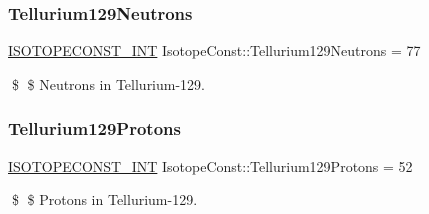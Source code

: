 \subsubsection{\texorpdfstring{Tellurium129\+Neutrons}{Tellurium129Neutrons}}
{\footnotesize\ttfamily \mbox{\hyperlink{group___isotope_const-_macros_ga5f18360b3e99483a35c32d789e62621c}{I\+S\+O\+T\+O\+P\+E\+C\+O\+N\+S\+T\+\_\+\+I\+NT}} Isotope\+Const\+::\+Tellurium129\+Neutrons = 77}

\$ \$ Neutrons in Tellurium-\/129. \mbox{\label{group___isotope_const-_tellurium-_te129_ga46d81286ac1d2b41a9a93f7f2b07fe74}} 
\subsubsection{\texorpdfstring{Tellurium129\+Protons}{Tellurium129Protons}}
{\footnotesize\ttfamily \mbox{\hyperlink{group___isotope_const-_macros_ga5f18360b3e99483a35c32d789e62621c}{I\+S\+O\+T\+O\+P\+E\+C\+O\+N\+S\+T\+\_\+\+I\+NT}} Isotope\+Const\+::\+Tellurium129\+Protons = 52}

\$ \$ Protons in Tellurium-\/129. 